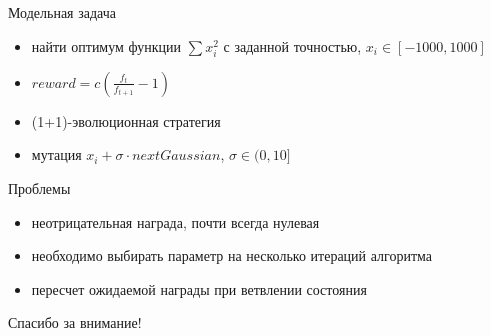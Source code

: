 \documentclass[hyperref=unicode,graphics=pdflatex,13pt]{beamer}
\begin{document}
\begin{frame}{Модельная задача}
    \begin{itemize}
        \item найти оптимум функции $\sum{x_i^2}$ с заданной точностью, $x_i \in [-1000, 1000]$
        \item $reward = c(\frac{f_t}{f_{t + 1}} - 1)$
        \item (1+1)-эволюционная стратегия
        \item мутация $x_i + \sigma \cdot nextGaussian$, $\sigma \in (0, 10]$
    \end{itemize}
\end{frame}

\begin{frame}{Проблемы}
    \begin{itemize}
        \item неотрицательная награда, почти всегда нулевая
        \item необходимо выбирать параметр на несколько итераций алгоритма
        \item пересчет ожидаемой награды при ветвлении состояния
    \end{itemize}
\end{frame}

\begin{frame}
    \begin{center}
        Спасибо за внимание!
    \end{center}
\end{frame}
\end{document}
